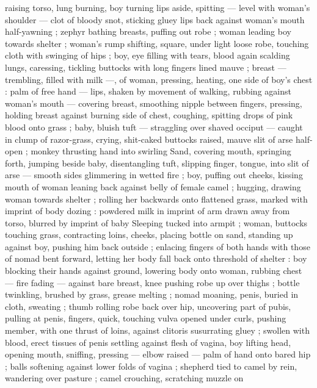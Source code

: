 raising torso, lung burning, boy turning lips aside, spitting --- level 
with woman's shoulder --- clot of bloody snot, sticking gluey lips 
back against woman's mouth half-yawning ; zephyr bathing breasts, 
puffing out robe ; woman leading boy towards shelter ; woman's 
rump shifting, square, under light loose robe, touching cloth with 
swinging of hips ; boy, eye filling with tears, blood again scalding 
lungs, caressing, tickling buttocks with long fingers lined mauve ; 
breast --- trembling, filled with milk ---, of woman, pressing, heating, 
one side of boy's chest : palm of free hand --- lips, shaken by 
movement of walking, rubbing against woman's mouth --- covering 
breast, smoothing nipple between fingers, pressing, holding breast 
against burning side of chest, coughing, spitting drops of pink blood 
onto grass ; baby, bluish tuft --- straggling over shaved occiput --- 
caught in clump of razor-grass, crying, shit-caked buttocks raised, 
mauve slit of arse half-open ; monkey thrusting hand into swirling 
Sand, covering mouth, springing forth, jumping beside baby, 
disentangling tuft, slipping finger, tongue, into slit of arse --- smooth 
sides glimmering in wetted fire ; boy, puffing out cheeks, kissing 
mouth of woman leaning back against belly of female camel ; 
hugging, drawing woman towards shelter ; rolling her backwards onto 
flattened grass, marked with imprint of body dozing : powdered milk 
in imprint of arm drawn away from torso, blurred by imprint of baby 
Sleeping tucked into armpit ; woman, buttocks touching grass, 
contracting loins, cheeks, placing bottle on sand, standing up against 
boy, pushing him back outside ; enlacing fingers of both hands with 
those of nomad bent forward, letting her body fall back onto 
threshold of shelter : boy blocking their hands against ground, 
lowering body onto woman, rubbing chest --- fire fading --- against 
bare breast, knee pushing robe up over thighs ; bottle twinkling, 
brushed by grass, grease melting ; nomad moaning, penis, buried in 
cloth, sweating ; thumb rolling robe back over hip, uncovering part of 
pubis, pulling at penis, fingers, quick, touching vulva opened under 
curls, pushing member, with one thrust of loins, against clitoris 
susurrating gluey ; swollen with blood, erect tissues of penis settling 
against flesh of vagina, boy lifting head, opening mouth, sniffing, 
pressing --- elbow raised --- palm of hand onto bared hip ; balls 
softening against lower folds of vagina ; shepherd tied to camel by 
rein, wandering over pasture ; camel crouching, scratching muzzle on 
